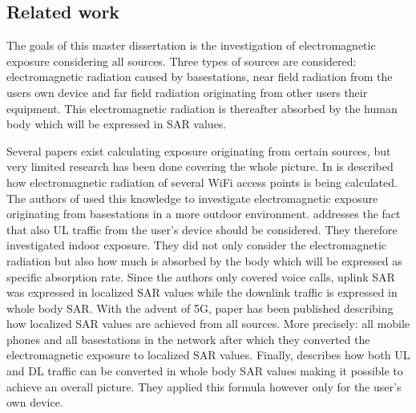
\subsection{Related work} %
\label{sub:general}
The goals of this master dissertation is the investigation of electromagnetic exposure considering all sources. Three types of sources are considered: electromagnetic radiation 
caused by basestations, near field radiation from the users own device and far field radiation originating from other users their equipment. This electromagnetic radiation is thereafter
absorbed by the human body which will be expressed in \gls{SAR} values.

Several papers exist calculating exposure originating from certain sources, but very limited research has been done covering the whole picture.
In \cite{J6_originalExposureFormula} is described how electromagnetic radiation of several WiFi access points is being calculated. The authors of \cite{J1} used this knowledge 
to investigate electromagnetic exposure originating from basestations in a more outdoor environment. \cite{J10_RDP, J10.1} addresses the fact that 
also \gls{UL} traffic from the user's device should be considered. They therefore investigated indoor exposure. They did not only consider the electromagnetic radiation
but also how much is absorbed by the body which will be expressed as specific absorption rate. Since the authors only covered voice calls,
uplink SAR was expressed in localized SAR values while the downlink traffic is expressed in whole body SAR. With the advent of 5G, paper \cite{J17_kuehn2019modelling} has been 
published describing how localized SAR values are achieved from all sources. More precisely: all mobile phones and all basestations in the network after which they converted the electromagnetic 
exposure to localized SAR values.
Finally, \cite{J22_plets2015joint} describes how both \gls{UL} and \gls{DL} traffic can be converted in whole body SAR values making it possible to achieve an overall picture. They applied this formula 
however only for the user's own device.

